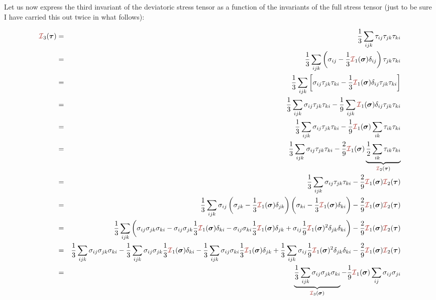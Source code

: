 \newpage
Let us now express the third invariant of the deviatoric stress tensor 
as a function of the invariants of the full stress tensor (just to be sure
I have carried this out twice in what follows): 


\begin{eqnarray}
{\III}_3(\bm\tau) 
&=& \frac13 \sum_{ijk} \tau_{ij}\tau_{jk}\tau_{ki} \nn\\
&=& \frac13 \sum_{ijk} 
\left(\sigma_{ij}-\frac13 {\III}_1(\bm\sigma) \delta_{ij}\right)
\tau_{jk}\tau_{ki} \nn\\
&=& \frac13 \sum_{ijk} 
\left[ 
\sigma_{ij}
\tau_{jk}\tau_{ki} 
-\frac13 {\III}_1(\bm\sigma) \delta_{ij}
\tau_{jk}\tau_{ki} 
\right]
\nn\\
&=& \frac13 
\sum_{ijk} 
\sigma_{ij}
\tau_{jk}\tau_{ki} 
-\frac19
\sum_{ijk} 
 {\III}_1(\bm\sigma) \delta_{ij}
\tau_{jk}\tau_{ki}
\nn\\
&=& \frac13 
\sum_{ijk} 
\sigma_{ij}
\tau_{jk}\tau_{ki} 
-\frac19
 {\III}_1(\bm\sigma) 
\sum_{ik} 
\tau_{ik}\tau_{ki}  
\nn\\
&=& \frac13 
\sum_{ijk} 
\sigma_{ij}
\tau_{jk}\tau_{ki} 
-\frac29
 {\III}_1(\bm\sigma)  
\underbrace{\frac12
\sum_{ik} 
\tau_{ik}\tau_{ki}}_{{\III}_2(\bm\tau)}
\nn\\
&=& \frac13 
\sum_{ijk} 
\sigma_{ij}
\tau_{jk}\tau_{ki} 
-\frac29  {\III}_1(\bm\sigma)  {\III}_2(\bm\tau)
\nn\\
&=& \frac13 
\sum_{ijk} 
\sigma_{ij}
\left(\sigma_{jk}-\frac13 {\III}_1(\bm\sigma)  \delta_{jk}\right)
\left(\sigma_{ki}-\frac13 {\III}_1(\bm\sigma)  \delta_{ki}\right)
-\frac29  {\III}_1(\bm\sigma)    {\III}_2(\bm\tau) 
\nn\\
&=& \frac13 
\sum_{ijk} \left( 
\sigma_{ij} \sigma_{jk} \sigma_{ki}
-\sigma_{ij}\sigma_{jk}\frac13 {\III}_1(\bm\sigma)  \delta_{ki}
-\sigma_{ij}\sigma_{ki}\frac13 {\III}_1(\bm\sigma)  \delta_{jk}
+ \sigma_{ij} \frac19 {\III}_1(\bm\sigma) ^2 \delta_{jk} \delta_{ki}
\right)
-\frac29  {\III}_1(\bm\sigma) {\III}_2(\bm\tau)
\nn\\
&=& 
\frac13 \sum_{ijk} \sigma_{ij} \sigma_{jk} \sigma_{ki} 
-\frac13 \sum_{ijk} \sigma_{ij}\sigma_{jk}\frac13 {\III}_1(\bm\sigma)  \delta_{ki}
-\frac13 \sum_{ijk} \sigma_{ij}\sigma_{ki}\frac13 {\III}_1(\bm\sigma)  \delta_{jk}
+\frac13 \sum_{ijk}  \sigma_{ij} \frac19 {\III}_1(\bm\sigma) ^2 \delta_{jk} \delta_{ki}
-\frac29  {\III}_1(\bm\sigma) {\III}_2(\bm\tau)
\nn\\
&=& 
\underbrace{\frac13 \sum_{ijk} \sigma_{ij} \sigma_{jk} \sigma_{ki}}_{{\III}_3(\bm\sigma)}
-\frac19 {\III}_1(\bm\sigma)  \sum_{ij} \sigma_{ij}\sigma_{ji} 

\end{eqnarray}

